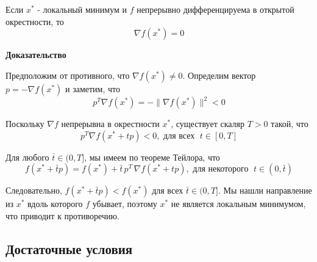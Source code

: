 \documentclass[
  russian,
  letterpaper,
  DIV=11,
  numbers=noendperiod]{scrartcl}
\begin{document}
\begin{tcolorbox}[enhanced jigsaw, opacityback=0, opacitybacktitle=0.6, toptitle=1mm, leftrule=.75mm, bottomrule=.15mm, colbacktitle=quarto-callout-color!10!white, breakable, title=\textcolor{quarto-callout-color}{\faInfo}\hspace{0.5em}{Необходимое условие оптимальности первого порядка}, left=2mm, bottomtitle=1mm, colback=white, titlerule=0mm, arc=.35mm, rightrule=.15mm, toprule=.15mm, coltitle=black, colframe=quarto-callout-color-frame]

Если \(x^*\) - локальный минимум и \(f\) непрерывно дифференцируема в
открытой окрестности, то \[
\nabla f(x^*) = 0
\]

\textbf{Доказательство}

Предположим от противного, что \(\nabla f(x^*) \neq 0\). Определим
вектор \(p = -\nabla f(x^*)\) и заметим, что \[
p^T \nabla f(x^*) = -\| \nabla f(x^*) \|^2 < 0
\]

Поскольку \(\nabla f\) непрерывна в окрестности \(x^*\), существует
скаляр \(T > 0\) такой, что \[
p^T \nabla f(x^* + tp) < 0, \text{ для всех }\; t \in [0,T]
\]

Для любого \(\bar{t} \in (0, T]\), мы имеем по теореме Тейлора, что \[
f(x^* + \bar{t}p) = f(x^*) + \bar{t}\, p^T \, \nabla f(x^* + tp), \text{ для некоторого }\; t \in (0,\bar{t})
\]

Следовательно, \(f(x^* + \bar{t}p) < f(x^*)\) для всех
\(\bar{t} \in (0, T]\). Мы нашли направление из \(x^*\) вдоль которого
\(f\) убывает, поэтому \(x^*\) не является локальным минимумом, что
приводит к противоречию.

\end{tcolorbox}

\subsection{Достаточные
условия}\label{ux434ux43eux441ux442ux430ux442ux43eux447ux43dux44bux435-ux443ux441ux43bux43eux432ux438ux44f}
\end{document}
